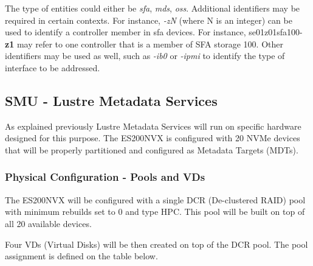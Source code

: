 \documentclass{article}
\begin{document}
The type of entities could either be \textit{sfa}, \textit{mds}, \textit{oss}.
Additional identifiers may be required in certain contexts. For instance, \textit{-zN} (where N is an integer) can be used to identify a controller member in sfa devices. For instance, se01z01sfa100-\textbf{z1} may refer to one controller that is a member of SFA storage 100. Other identifiers may be used as well, such as \textit{-ib0} or \textit{-ipmi} to identify the type of interface to be addressed.

\subsection{SMU - Lustre Metadata Services}
As explained previously Lustre Metadata Services will run on specific hardware designed for this purpose. The ES200NVX is configured with 20 NVMe devices that will be properly partitioned and configured as Metadata Targets (MDTs). 

\subsubsection{Physical Configuration - Pools and VDs}
The ES200NVX will be configured with a single DCR (De-clustered RAID) pool with minimum rebuilds set to 0 and type HPC. This pool will be built on top of all 20 available devices. 

Four VDs (Virtual Disks) will be then created on top of the DCR pool. The pool assignment is defined on the table below.

\begin{table}[htbp]
\caption{ES200NVX Disk Pools and Virtual Disks}
\label{tab:es200-pools-vds-table}
\end{table}
\end{document}

